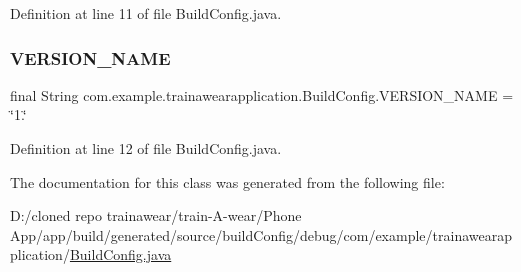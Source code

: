 Definition at line 11 of file Build\+Config.\+java.

\mbox{\label{classcom_1_1example_1_1trainawearapplication_1_1_build_config_a12c3ac31a655a45a92131508009313e2}} 
\subsubsection{\texorpdfstring{VERSION\_NAME}{VERSION\_NAME}}
{\footnotesize\ttfamily final String com.\+example.\+trainawearapplication.\+Build\+Config.\+V\+E\+R\+S\+I\+O\+N\+\_\+\+N\+A\+ME = \char`\"{}1.\char`\"{}\hspace{0.3cm}{\ttfamily [static]}}



Definition at line 12 of file Build\+Config.\+java.



The documentation for this class was generated from the following file\+:\begin{DoxyCompactItemize}
\item 
D\+:/cloned repo trainawear/train-\/\+A-\/wear/\+Phone App/app/build/generated/source/build\+Config/debug/com/example/trainawearapplication/\mbox{\hyperlink{debug_2com_2example_2trainawearapplication_2_build_config_8java}{Build\+Config.\+java}}\end{DoxyCompactItemize}
